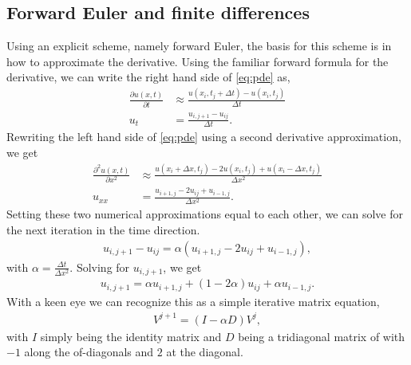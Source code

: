 \subsection{Forward Euler and finite differences}
Using an explicit scheme, namely forward Euler\citep[ch. 10.2.2]{hjorth-jensen_computational_2015}, the basis for this scheme is in how to approximate the derivative. Using the familiar forward formula for the derivative, we can write the right hand side of \eqref{eq:pde} as,
\begin{align*}
    \frac{\partial u(x,t)}{\partial t} &\approx \frac{u(x_i, t_j + \Delta t) - u(x_i, t_j)}{\Delta t} \\
    u_t &= \frac{u_{i,j+1} - u_{ij}}{\Delta t}.
\end{align*}
Rewriting the left hand side of \eqref{eq:pde} using a second derivative approximation, we get
\begin{align*}
\frac{\partial^2 u(x,t)}{\partial x^2} &\approx \frac{u(x_i+\Delta x,t_j) - 2u(x_i,t_j) + u(x_i-\Delta x, t_j)}{\Delta x^2} \\
u_{xx} &= \frac{u_{i+1,j} - 2u_{ij} + u_{i-1,j}}{\Delta x^2}.
\end{align*}
Setting these two numerical approximations equal to each other, we can solve for the next iteration in the time direction.
\begin{align*}
    u_{i,j+1} - u_{ij} = \alpha (u_{i+1,j} - 2 u_{ij} + u_{i-1,j}),
\end{align*}
with $\alpha = \frac{\Delta t}{\Delta x^2}$. Solving for $u_{i,j+1}$, we get
\begin{align}
    u_{i,j+1} = \alpha u_{i+1,j} + (1 - 2 \alpha) u_{ij} + \alpha u_{i-1,j}.
    \label{eq:explicit-forward-euler-discretized}
\end{align}
With a keen eye we can recognize this as a simple iterative matrix equation,
\begin{align}
    V^{j+1} = (I - \alpha D) V^j,
    \label{eq:fw-euler-matrix}
\end{align}
with $I$ simply being the identity matrix and $D$ being a tridiagonal matrix of with $-1$ along the of-diagonals and $2$ at the diagonal.

